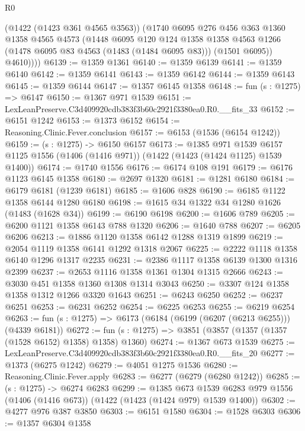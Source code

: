 \begin{lexlean}{R0}
\begin{coremodule}
          (@1422 (@1423 @361 @4565 @3563))
          (@1740
            @6095
            @276
            @456
            @363
            @1360
            @1358
            @4565
            @4573
            (@1448
              @6095
              @120
              @124
              @1358
              @1358
              @4563
              @1266
              (@1478 @6095 @83 @4563 (@1483 (@1484 @6095 @83)))
              (@1501 @6095))
            @4610))))
@6139 := @1359 @1361
@6140 := @1359 @6139
@6141 := @1359 @6140
@6142 := @1359 @6141
@6143 := @1359 @6142
@6144 := @1359 @6143
@6145 := @1359 @6144
@6147 := @1357 @6145 @1358
@6148 := fun (s : @1275) => @6147
@6150 := @1367 @971 @1539
@6151 := LexLeanPreserve.C3d409920cdb383f3b60c2921f3380ea0.R0.__fits_33
@6152 := @6151 @1242
@6153 := @1373 @6152
@6154 := Reasoning.Clinic.Fever.conclusion
@6157 := @6153 (@1536 (@6154 @1242))
@6159 := (s : @1275) -> @6150 @6157
@6173 := @1385
    @971
    @1539
    @6157
    @1125
    @1556
    (@1406 (@1416 @971))
    (@1422 (@1423 (@1424 @1125) @1539 @1400))
@6174 := @1740 @1556
@6176 := @6174 @108 @191
@6179 := @6176 @1123 @6145 @1358
@6180 := @2697 @1320
@6181 := @1281 @6180
@6184 := @6179 @6181 (@1239 @6181)
@6185 := @1606 @828
@6190 := @6185 @1122 @1358 @6144 @1280 @6180
@6198 := @1615 @34 @1322 @34 @1280 @1626 (@1483 (@1628 @34))
@6199 := @6190 @6198
@6200 := @1606 @789
@6205 := @6200 @1121 @1358 @6143 @788 @1320
@6206 := @1640 @788
@6207 := @6205 @6206
@6213 := @1886 @1120 @1358 @6142 @1288 @1319 @1899
@6219 := @2054 @1119 @1358 @6141 @1292 @1318 @2067
@6225 := @2222 @1118 @1358 @6140 @1296 @1317 @2235
@6231 := @2386 @1117 @1358 @6139 @1300 @1316 @2399
@6237 := @2653 @1116 @1358 @1361 @1304 @1315 @2666
@6243 := @3030 @451 @1358 @1360 @1308 @1314 @3043
@6250 := @3307 @124 @1358 @1358 @1312 @1266 @3320 @1643
@6251 := @6243 @6250
@6252 := @6237 @6251
@6253 := @6231 @6252
@6254 := @6225 @6253
@6255 := @6219 @6254
@6263 := fun (s : @1275) => @6173 (@6184 (@6199 (@6207 (@6213 @6255))) (@4339 @6181))
@6272 := fun (s : @1275) => @3851 (@3857 (@1357 (@1357 (@1528 @6152) @1358) @1358) @1360)
@6274 := @1367 @673 @1539
@6275 := LexLeanPreserve.C3d409920cdb383f3b60c2921f3380ea0.R0.__fits_20
@6277 := @1373 (@6275 @1242)
@6279 := @4051 @1275 @1536
@6280 := Reasoning.Clinic.Fever.apply
@6283 := @6277 (@6279 (@6280 @1242))
@6285 := (s : @1275) -> @6274 @6283
@6299 := @1385
    @673
    @1539
    @6283
    @979
    @1556
    (@1406 (@1416 @673))
    (@1422 (@1423 (@1424 @979) @1539 @1400))
@6302 := @4277 @976 @387 @3850
@6303 := @6151 @1580
@6304 := @1528 @6303
@6306 := @1357 @6304 @1358

\end{coremodule}
\end{lexlean}
